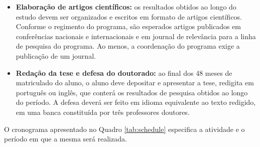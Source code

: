 \begin{itemize}
\item \textbf{Elaboração de artigos científicos:} os resultados obtidos ao longo do estudo devem ser organizados e escritos em formato de artigos científicos. Conforme o regimento do programa, são esperados artigos publicados em conferências nacionais e internacionais e em journal de relevância para a linha de pesquisa do programa. Ao menos, a coordenação do programa exige a publicação de um journal.

\item \textbf{Redação da tese e defesa do doutorado:} ao final dos 48 meses de matriculado do aluno, o aluno deve depositar e apresentar a tese, redigita em português ou inglês, que conterá os resultados de pesquisa obtidos ao longo do período. A defesa deverá ser feito em idioma equivalente ao texto redigido, em uma banca constituída por três professores doutores.

\end{itemize}

O cronograma apresentado no Quadro \ref{tab:schedule} especifica a atividade e o período em que a mesma será realizada.



